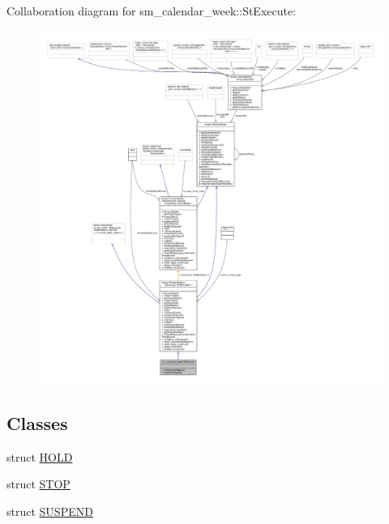 Collaboration diagram for sm\+\_\+calendar\+\_\+week\+:\+:St\+Execute\+:
\nopagebreak
\begin{figure}[H]
\begin{center}
\leavevmode
\includegraphics[width=350pt]{structsm__calendar__week_1_1StExecute__coll__graph}
\end{center}
\end{figure}
\subsection*{Classes}
\begin{DoxyCompactItemize}
\item 
struct \hyperlink{structsm__calendar__week_1_1StExecute_1_1HOLD}{H\+O\+LD}
\item 
struct \hyperlink{structsm__calendar__week_1_1StExecute_1_1STOP}{S\+T\+OP}
\item 
struct \hyperlink{structsm__calendar__week_1_1StExecute_1_1SUSPEND}{S\+U\+S\+P\+E\+ND}
\end{DoxyCompactItemize}
